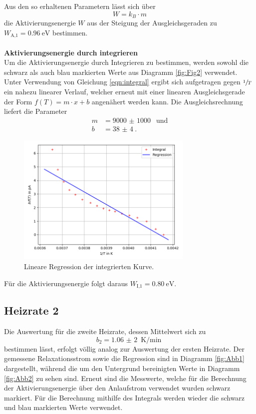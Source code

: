 Aus den so erhaltenen Parametern lässt sich über
\begin{equation}
  W=k_{B}\cdot m
  \label{eqn:Aktivierung}
\end{equation}
die Aktivierungsenergie $W$ aus der Steigung der Ausgleichsgeraden zu $W_\text{A,1}=\SI{0,96}{\eV}$ bestimmen.
\\
\\
\textbf{Aktivierungsenergie durch integrieren}\\
Um die Aktivierungsenergie durch Integrieren zu bestimmen, werden sowohl die schwarz als auch blau markierten
Werte aus Diagramm \ref{fig:Fig2} verwendet. Unter Verwendung von Gleichung \ref{eqn:integral} ergibt sich aufgetragen
gegen $\sfrac{1}{T}$ ein nahezu linearer Verlauf, welcher erneut mit einer linearen Ausgleichsgerade der
Form $f(T)=m\cdot x+b$ angenähert werden kann. Die Ausgleichsrechnung liefert die Parameter
\begin{align}
  m&=\SI{9000(1000)}{}\;\; \text{und}\\
  b&=\SI{38(4)}{}.
\end{align}

\begin{figure}[H]
  \centering
  \includegraphics[width=0.75\textwidth]{Dipol1Integral.png}
  \caption{Lineare Regression der integrierten Kurve.}
  \label{fig:Fig4}
\end{figure}

Für die Aktivierungsenergie folgt daraus $W_\text{I,1}=\SI{0,80}{\eV}$.

\subsection{Heizrate 2}
Die Auswertung für die zweite Heizrate, dessen Mittelwert sich zu
\begin{equation}
  b_2=\SI{1,06(2)}{\K\per\min}
\end{equation}
bestimmen lässt, erfolgt völlig analog zur Auswertung der ersten Heizrate.
Der gemessene Relaxationsstrom sowie die Regression sind in Diagramm \ref{fig:Abb1} dargestellt, während
die um den Untergrund bereinigten Werte in Diagramm \ref{fig:Abb2} zu sehen sind. Erneut sind die Messwerte, welche für
die Berechnung der Aktivierungsenergie über den Anlaufstrom verwendet wurden schwarz markiert. Für die Berechnung
mithilfe des Integrals werden wieder die schwarz und blau markierten Werte verwendet.

